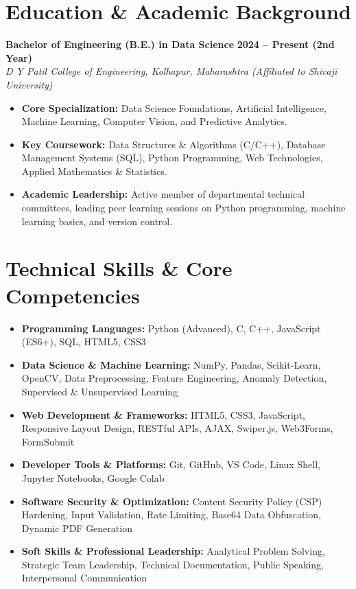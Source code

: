 \documentclass[a4paper,10pt]{article}
\begin{document}
\section{Education \& Academic Background}
\textbf{Bachelor of Engineering (B.E.) in Data Science} \hfill \textbf{2024 -- Present (2nd Year)} \\
\textit{D Y Patil College of Engineering, Kolhapur, Maharashtra (Affiliated to Shivaji University)}
\begin{itemize}
    \item \textbf{Core Specialization:} Data Science Foundations, Artificial Intelligence, Machine Learning, Computer Vision, and Predictive Analytics.
    \item \textbf{Key Coursework:} Data Structures \& Algorithms (C/C++), Database Management Systems (SQL), Python Programming, Web Technologies, Applied Mathematics \& Statistics.
    \item \textbf{Academic Leadership:} Active member of departmental technical committees, leading peer learning sessions on Python programming, machine learning basics, and version control.
\end{itemize}

\section{Technical Skills \& Core Competencies}
\begin{itemize}
    \item \textbf{Programming Languages:} Python (Advanced), C, C++, JavaScript (ES6+), SQL, HTML5, CSS3
    \item \textbf{Data Science \& Machine Learning:} NumPy, Pandas, Scikit-Learn, OpenCV, Data Preprocessing, Feature Engineering, Anomaly Detection, Supervised \& Unsupervised Learning
    \item \textbf{Web Development \& Frameworks:} HTML5, CSS3, JavaScript, Responsive Layout Design, RESTful APIs, AJAX, Swiper.js, Web3Forms, FormSubmit
    \item \textbf{Developer Tools \& Platforms:} Git, GitHub, VS Code, Linux Shell, Jupyter Notebooks, Google Colab
    \item \textbf{Software Security \& Optimization:} Content Security Policy (CSP) Hardening, Input Validation, Rate Limiting, Base64 Data Obfuscation, Dynamic PDF Generation
    \item \textbf{Soft Skills \& Professional Leadership:} Analytical Problem Solving, Strategic Team Leadership, Technical Documentation, Public Speaking, Interpersonal Communication
\end{itemize}
\end{document}

